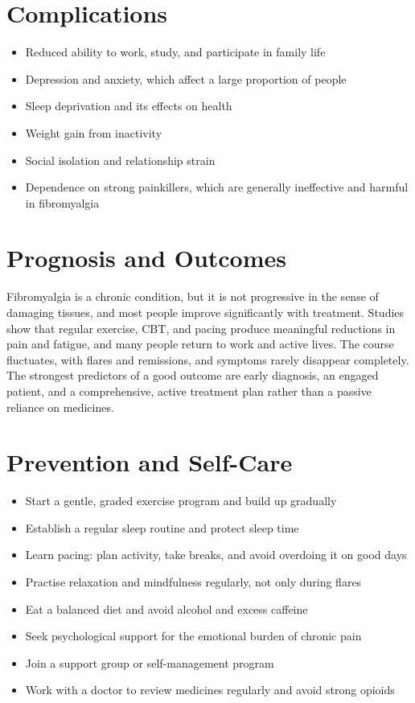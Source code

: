 \section*{Complications}
\begin{itemize}
    \item Reduced ability to work, study, and participate in family life
    \item Depression and anxiety, which affect a large proportion of people
    \item Sleep deprivation and its effects on health
    \item Weight gain from inactivity
    \item Social isolation and relationship strain
    \item Dependence on strong painkillers, which are generally ineffective and harmful in fibromyalgia
\end{itemize}

\section*{Prognosis and Outcomes}
Fibromyalgia is a chronic condition, but it is not progressive in the sense of damaging tissues, and most people improve significantly with treatment. Studies show that regular exercise, CBT, and pacing produce meaningful reductions in pain and fatigue, and many people return to work and active lives. The course fluctuates, with flares and remissions, and symptoms rarely disappear completely. The strongest predictors of a good outcome are early diagnosis, an engaged patient, and a comprehensive, active treatment plan rather than a passive reliance on medicines.

\section*{Prevention and Self-Care}
\begin{itemize}
    \item Start a gentle, graded exercise program and build up gradually
    \item Establish a regular sleep routine and protect sleep time
    \item Learn pacing: plan activity, take breaks, and avoid overdoing it on good days
    \item Practise relaxation and mindfulness regularly, not only during flares
    \item Eat a balanced diet and avoid alcohol and excess caffeine
    \item Seek psychological support for the emotional burden of chronic pain
    \item Join a support group or self-management program
    \item Work with a doctor to review medicines regularly and avoid strong opioids
\end{itemize}

